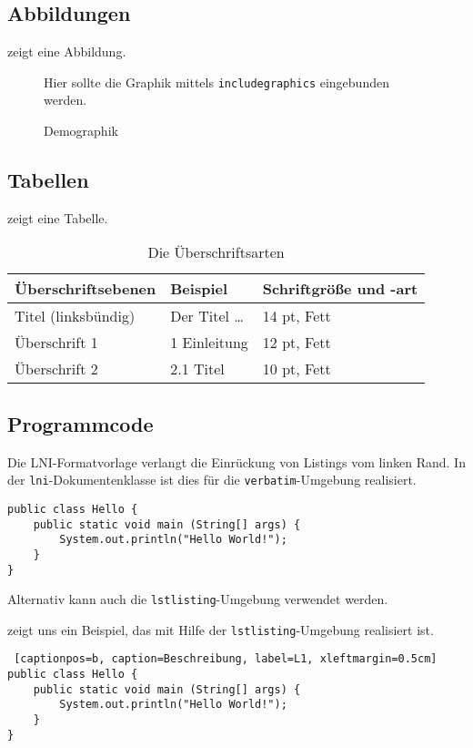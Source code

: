 \documentclass{lni}
\begin{document}
\subsection{Abbildungen}
 zeigt eine Abbildung.

\begin{figure}
  \centering
  Hier sollte die Graphik mittels \texttt{includegraphics} eingebunden werden.

  \caption{Demographik}
  \label{fig:demo}
\end{figure}

\subsection{Tabellen}
 zeigt eine Tabelle.

\begin{table}
\centering
\begin{tabular}{lll}
\toprule
Überschriftsebenen & Beispiel & Schriftgröße und -art \\
\midrule
Titel (linksbündig) & Der Titel \ldots & 14 pt, Fett\\
Überschrift 1 & 1 Einleitung & 12 pt, Fett\\
Überschrift 2 & 2.1 Titel & 10 pt, Fett\\
\bottomrule
\end{tabular}
\caption{Die Überschriftsarten}
\label{tab:demo}
\end{table}

\subsection{Programmcode}
Die LNI-Formatvorlage verlangt die Einrückung von Listings vom linken Rand.
In der \texttt{lni}-Dokumentenklasse ist dies für die \texttt{verbatim}-Umgebung realisiert.

\begin{verbatim}
public class Hello { 
    public static void main (String[] args) { 
        System.out.println("Hello World!"); 
    } 
} 
\end{verbatim}

Alternativ kann auch die \texttt{lstlisting}-Umgebung verwendet werden.

 zeigt uns ein Beispiel, das mit Hilfe der \texttt{lstlisting}-Umgebung realisiert ist.

\lstset{basicstyle=\ttfamily}
\begin{lstlisting} [captionpos=b, caption=Beschreibung, label=L1, xleftmargin=0.5cm]
public class Hello { 
    public static void main (String[] args) { 
        System.out.println("Hello World!"); 
    } 
}
\end{lstlisting}
\end{document}
